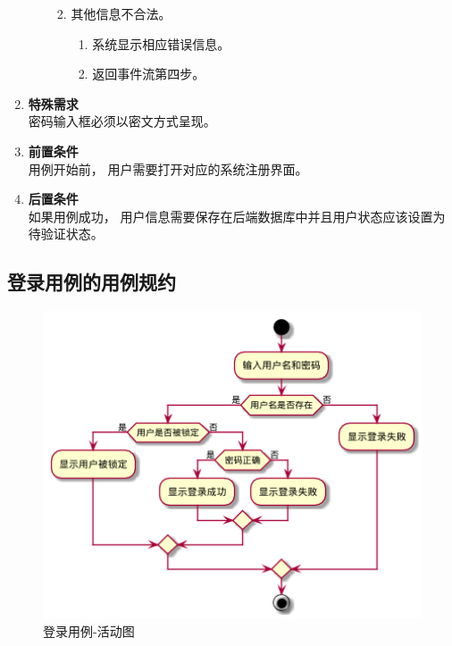 \begin{enumerate}
\begin{enumerate}
\begin{enumerate}
\begin{enumerate}
            \end{enumerate}
            \item 其他信息不合法。
            \begin{enumerate}
                \item 系统显示相应错误信息。
                \item 返回事件流第四步。
            \end{enumerate}
        \end{enumerate}
    \end{enumerate}
    \item \textbf{特殊需求} \\ 密码输入框必须以密文方式呈现。
    \item \textbf{前置条件} \\ 用例开始前， 用户需要打开对应的系统注册界面。
    \item \textbf{后置条件} \\ 如果用例成功， 用户信息需要保存在后端数据库中并且用户状态应该设置为待验证状态。
\end{enumerate}

\subsection{登录用例的用例规约}

    \begin{figure}[htp]
        \centering
        \includegraphics[width=12cm]{figure/usecase/uc_sub/uc_login.png}
        \caption{登录用例-活动图}
        \label{fig:logon-uml}
    \end{figure}
    

